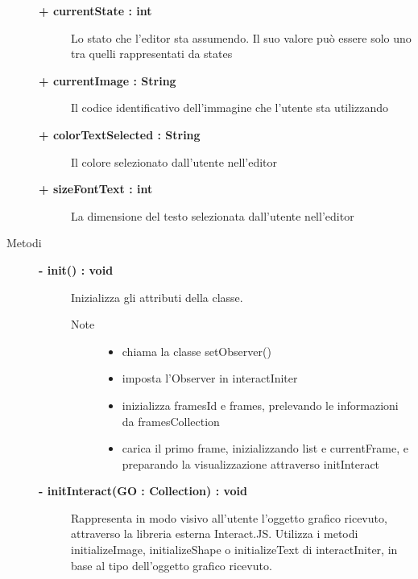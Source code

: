 \begin{description}
\begin{description}
		\item[\textbf{+ currentState : int			}] \hfill
			Lo stato che l'editor sta assumendo. Il suo valore può essere solo uno tra quelli rappresentati da states
		\item[\textbf{+ currentImage : String			}] \hfill
			Il codice identificativo dell'immagine che l'utente sta utilizzando
		\item[\textbf{+ colorTextSelected : String			}] \hfill
			Il colore selezionato dall'utente nell'editor
		\item[\textbf{+ sizeFontText : int			}] \hfill
			La dimensione del testo selezionata dall'utente nell'editor
	\end{description}
	
	
\item[Metodi] \hfill

	\begin{description}
		\item[\textbf{\color{blue}- init() : void			}] \hfill
			Inizializza gli attributi della classe.
			
		\begin{description}
			
			\item[Note] \hfill
			\begin{itemize}
					\item chiama la classe setObserver()
					\item imposta l'Observer in interactIniter
					\item inizializza framesId e frames, prelevando le informazioni da framesCollection
					\item carica il primo frame, inizializzando list e currentFrame, e preparando la visualizzazione attraverso initInteract
			\end{itemize}
		\end{description}
	\end{description}
	
	
	\begin{description}
		\item[\textbf{\color{blue}- initInteract(GO : Collection) : void			}] \hfill
			Rappresenta in modo visivo all'utente l'oggetto grafico ricevuto, attraverso la libreria esterna Interact.JS. Utilizza i metodi initializeImage, initializeShape o initializeText di interactIniter, in base al tipo dell'oggetto grafico ricevuto.
			

\end{description}
\end{description}
